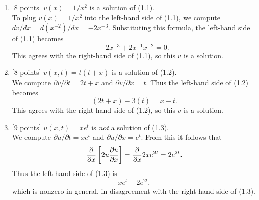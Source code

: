 \begin{solution}
\begin{enumerate}
\item $[$8 points] $v(x) = 1/x^2$ is a solution of (1.1).\\      
      To plug $v(x) = 1/x^2$ into the left-hand side of (1.1), we compute
      $dv/dx = d(x^{-2})/dx = -2x^{-3}$.  Substituting this formula,
      the left-hand side of (1.1) becomes 
           \[ -2x^{-3} + 2x^{-1}x^{-2} = 0.\]
      This agrees with the right-hand side of (1.1), so this $v$ is a solution.

\item $[$8 points] $v(x,t) = t(t+x)$ is a solution of (1.2).\\
      We compute $\partial v/\partial t =  2t+x$ and
                 $\partial v/\partial x = t$.
      Thus the left-hand side of (1.2) becomes
        \[ (2t+x) - 3(t) = x-t.\]
      This agrees with the right-hand side of (1.2), so this $v$ is a solution.

\item $[$9 points] $u(x,t) = x e^t$ is \emph{not} a solution of (1.3).\\
       We compute $\partial u /\partial t = xe^t$ and 
       $\partial u/\partial x = e^t$.
       From this it follows that 
           \[ {\partial\over \partial x} \left[ 2u {\partial u\over \partial x}\right]
                = {\partial \over \partial x} 2xe^{2t} = 2e^{2t}.\]
       Thus the left-hand side of (1.3) is
            \[ xe^t -2e^{2t},\]
       which is nonzero in general, in disagreement with the right-hand side of (1.3).
\end{enumerate}


\end{solution}